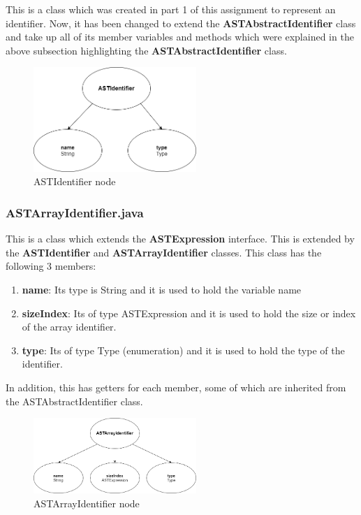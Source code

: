 \documentclass{article}
\begin{document}
					This is a class which was created in part 1 of this assignment to represent an identifier. Now, it has been changed to extend the \textbf{ASTAbstractIdentifier} class and take up all of its member variables and methods which were explained in the above subsection highlighting the \textbf{ASTAbstractIdentifier} class.
					
					\begin{figure}[H]
					\centering
			 			\includegraphics[width=0.55\textwidth]{astidentifier.png}
			  			\caption{ASTIdentifier node}
			  			\label{fig:astidentifier}
					\end{figure}
					
							\subsubsection{ASTArrayIdentifier.java}
					
					This is a class which extends the \textbf{ASTExpression} interface. This is extended by the \textbf{ASTIdentifier} and \textbf{ASTArrayIdentifier} classes. This class has the following 3 members: 
					\begin{enumerate}
					\item \textbf{name}: Its type is String and it is used to hold the variable name
					\item \textbf{sizeIndex}: Its of type ASTExpression and it is used to hold the size or index of the array identifier.
					\item \textbf{type}: Its of type Type (enumeration) and it is used to hold the type of the identifier.
				
					\end{enumerate}
			In addition, this has getters for each member, some of which are inherited from the ASTAbstractIdentifier class.
					
								\begin{figure}[H]
					\centering
			 			\includegraphics[width=0.55\textwidth]{astarrayidentifier.png}
			  			\caption{ASTArrayIdentifier node}
			  			\label{fig:astarrayidentifier}
					\end{figure}
					
\end{document}
